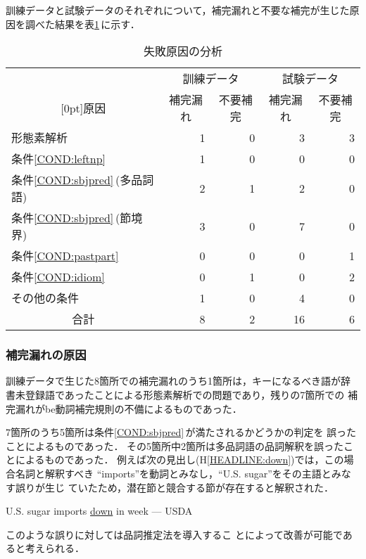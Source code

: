 訓練データと試験データのそれぞれについて，補完漏れと不要な補完が生じた原
因を調べた結果を表\ref{tab:error_cause}\,に示す．
\begin{table}[htbp]
\caption{失敗原因の分析}
\label{tab:error_cause}
\begin{center}
\begin{tabular}{|l||r|r|r|r|}\hline
&\multicolumn{2}{|c|}{訓練データ}&\multicolumn{2}{|c|}{試験データ}
\\\cline{2-5}
\multicolumn{1}{|c||}{\raisebox{1.5ex}[0pt]{原因}}&
\multicolumn{1}{|c|}{補完漏れ} & \multicolumn{1}{|c|}{不要補完}&
\multicolumn{1}{|c|}{補完漏れ} & \multicolumn{1}{|c|}{不要補完} \\\hline\hline
形態素解析                         & 1 & 0 &  3 & 3 \\
条件\ref{COND:leftnp}              & 1 & 0 &  0 & 0 \\
条件\ref{COND:sbjpred}\,(多品詞語) & 2 & 1 &  2 & 0 \\
条件\ref{COND:sbjpred}\,(節境界)   & 3 & 0 &  7 & 0 \\
条件\ref{COND:pastpart}            & 0 & 0 &  0 & 1 \\
条件\ref{COND:idiom}               & 0 & 1 &  0 & 2 \\
その他の条件                       & 1 & 0 &  4 & 0 \\\hline
\multicolumn{1}{|c||}{合計}         & 8 & 2 & 16 & 6 \\\hline
\end{tabular}
\end{center}
\end{table}

\subsubsection{補完漏れの原因}

訓練データで生じた8箇所での補完漏れのうち1箇所は，キーになるべき語が辞
書未登録語であったことによる形態素解析での問題であり，残りの7箇所での
補完漏れがbe動詞補完規則の不備によるものであった．

7箇所のうち5箇所は条件\ref{COND:sbjpred}\,が満たされるかどうかの判定を
誤ったことによるものであった．
その5箇所中2箇所は多品詞語の品詞解釈を誤ったことによるものであった．
例えば次の見出し(H\ref{HEADLINE:down})では，この場合名詞と解釈すべき
``imports''を動詞とみなし，``U.S. sugar''をその主語とみなす誤りが生じ
ていたため，潜在節と競合する節が存在すると解釈された．
\begin{HEADLINE}
\headline U.S. sugar imports \underline{down} in week --- USDA
\label{HEADLINE:down}
\end{HEADLINE}
このような誤りに対しては品詞推定法\cite{Takeda93,Takeda95}を導入するこ
とによって改善が可能であると考えられる．

